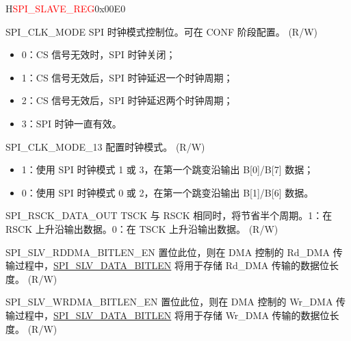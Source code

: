 \begin{register}{H}{\textcolor{red}{SPI\_SLAVE\_REG}}{0x{}00E0}\label{regdesc:SPISLAVEREG}
%
%
%
%
%
%
%
%
%
%
%
%
%
%
\regnewline%
\begin{regdesc}\begin{reglist}
\label{fielddesc:SPICLKMODE}\item [SPI\_CLK\_MODE] SPI 时钟模式控制位。可在 CONF 阶段配置。 (R/W)
\begin{itemize}
    \item 0：CS 信号无效时，SPI 时钟关闭；
    \item 1：CS 信号无效后，SPI 时钟延迟一个时钟周期；
    \item 2：CS 信号无效后，SPI 时钟延迟两个时钟周期；
    \item 3：SPI 时钟一直有效。
\end{itemize}
\label{fielddesc:SPICLKMODE13}\item [SPI\_CLK\_MODE\_13] 配置时钟模式。 (R/W)
\begin{itemize}
    \item 1：使用 SPI 时钟模式 1 或 3，在第一个跳变沿输出 B[0]/B[7] 数据；
    \item 0：使用 SPI 时钟模式 0 或 2，在第一个跳变沿输出 B[1]/B[6] 数据。
\end{itemize}
\label{fielddesc:SPIRSCKDATAOUT}\item [SPI\_RSCK\_DATA\_OUT] TSCK 与 RSCK 相同时，将节省半个周期。1：在 RSCK 上升沿输出数据。0：在 TSCK 上升沿输出数据。 (R/W)
\label{fielddesc:SPISLVRDDMABITLENEN}\item [SPI\_SLV\_RDDMA\_BITLEN\_EN] 置位此位，则在 DMA 控制的 Rd\_DMA 传输过程中，\hyperref[fielddesc:SPISLVDATABITLEN]{SPI\_SLV\_DATA\_BITLEN} 将用于存储 Rd\_DMA 传输的数据位长度。 (R/W)
\label{fielddesc:SPISLVWRDMABITLENEN}\item [SPI\_SLV\_WRDMA\_BITLEN\_EN] 置位此位，则在 DMA 控制的 Wr\_DMA 传输过程中，\hyperref[fielddesc:SPISLVDATABITLEN]{SPI\_SLV\_DATA\_BITLEN} 将用于存储 Wr\_DMA 传输的数据位长度。 (R/W)

\end{reglist}
\end{regdesc}
\end{register}
